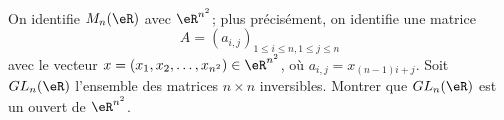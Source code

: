 \begin{exercice}[\coolexo]\label{exoEspVectoNorme0009}

On identifie $M_n(\eR)$  avec $ \eR^{n^2}$; plus précisément, on identifie une matrice 
\begin{equation}
	A = (a_{i,j})_{1\leq i \leq n, 1 \leq j \leq n}
\end{equation}
avec le vecteur $x = (x_1, x_2, \dots, x_{n^2}) \in \eR^{n^2}$, où $ a_{i,j} = x_{(n-1)i + j}$.  Soit  $GL_n(\eR)$ l'ensemble des matrices $n \times n$ inversibles.  Montrer que $GL_n(\eR)$ est un ouvert de $ \eR^{n^2}$. 

\end{exercice}
